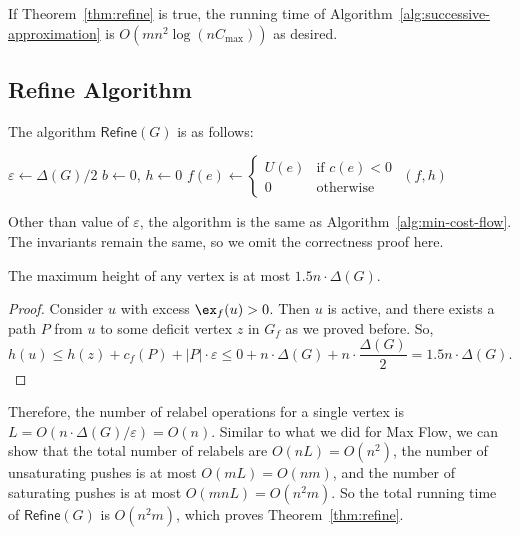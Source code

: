 If Theorem~\ref{thm:refine} is true, the running time of Algorithm~\ref{alg:successive-approximation} is $O(mn^2 \log(nC_{\max}))$ as desired.

\subsection{Refine Algorithm}

The algorithm $\mathsf{Refine}(G)$ is as follows:

\begin{algorithm}[H]
	\caption{$\mathsf{Refine}(G)$}
	\label{alg:refine}
	$\varepsilon \gets \Delta(G)/2$\;
	$b\gets 0$, $h\gets 0$\;
	$f(e)\gets\begin{cases}
		U(e) & \text{if $c(e) < 0$} \\
		0    & \text{otherwise}
		\end{cases}$\;
	\Return $(f,h)$\;
\end{algorithm}

Other than value of $\varepsilon$, the algorithm is the same as Algorithm~\ref{alg:min-cost-flow}.
The invariants remain the same, so we omit the correctness proof here.

\begin{lemma}
	The maximum height of any vertex is at most $1.5 n \cdot \Delta(G)$.
\end{lemma}
\begin{proof}
	Consider $u$ with excess $\ex_f(u) > 0$.
	Then $u$ is active, and there exists a path $P$ from $u$ to some deficit vertex $z$ in $G_f$ as we proved before.
	So,
	\[ h(u) \le h(z) + c_f(P) + |P| \cdot \varepsilon \le 0 + n \cdot \Delta(G) + n \cdot \frac{\Delta(G)}{2} = 1.5 n \cdot \Delta(G). \]
\end{proof}

Therefore, the number of relabel operations for a single vertex is $L = O(n \cdot \Delta(G)/\varepsilon) = O(n)$. Similar to what we did for Max Flow, we can show that the total number of relabels are $O(nL) = O(n^2)$, the number of unsaturating pushes is at most $O(mL) = O(nm)$, and the number of saturating pushes is at most $O(mnL)=O(n^2 m)$.
So the total running time of $\mathsf{Refine}(G)$ is $O(n^2 m)$, which proves Theorem~\ref{thm:refine}.

